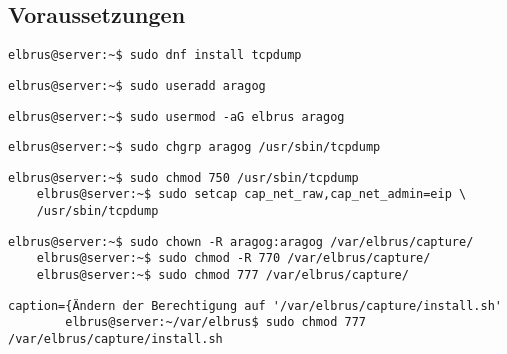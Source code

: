 \subsection{Voraussetzungen}

\lstset{style=commands}
\begin{lstlisting}[caption={Installieren von 'tcpdump' für das aufzeichnen von Daten.}]
	elbrus@server:~$ sudo dnf install tcpdump
\end{lstlisting}

\lstset{style=commands}
\begin{lstlisting}[caption={Anlegen eines Users der Berechtigungen zum ausführen von 'tcpdump' erhält.}]
	elbrus@server:~$ sudo useradd aragog
\end{lstlisting}

\lstset{style=commands}
\begin{lstlisting}[caption={Hinzufügen von User 'aragog' zu Gruppe 'elbrus'.}]
	elbrus@server:~$ sudo usermod -aG elbrus aragog
\end{lstlisting}

\lstset{style=commands}
\begin{lstlisting}[caption={Zuweisen von 'tcpdump' zu der Gruppe 'aragog'.}]
	elbrus@server:~$ sudo chgrp aragog /usr/sbin/tcpdump
\end{lstlisting}

\lstset{style=commands}
\begin{lstlisting}[caption={Ändern der Berechtigungen auf 'tcpdump'.}]
	elbrus@server:~$ sudo chmod 750 /usr/sbin/tcpdump
	elbrus@server:~$ sudo setcap cap_net_raw,cap_net_admin=eip \
	/usr/sbin/tcpdump
\end{lstlisting}

\lstset{style=commands}
\begin{lstlisting}[caption={Wechseln des Owners \& der Berechtigung auf '/var/elbrus/capture/'}]
	elbrus@server:~$ sudo chown -R aragog:aragog /var/elbrus/capture/
	elbrus@server:~$ sudo chmod -R 770 /var/elbrus/capture/
	elbrus@server:~$ sudo chmod 777 /var/elbrus/capture/
\end{lstlisting}

\lstset{style=commands}
\begin{lstlisting}caption={Ändern der Berechtigung auf '/var/elbrus/capture/install.sh'
		elbrus@server:~/var/elbrus$ sudo chmod 777 /var/elbrus/capture/install.sh
	\end{lstlisting}
	\newpage
	
